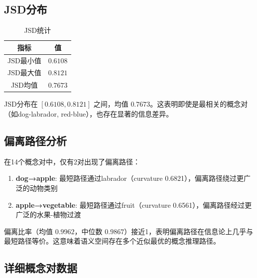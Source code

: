 \documentclass[
 UTF8,
 fontset=mac,
]{ctexart}
\begin{document}
\subsection{JSD分布}\label{jsd-results}

\begin{table}[htbp]
\centering
\caption{JSD统计}
\begin{tabular}{cc}
\toprule
指标 & 值 \\
\midrule
JSD最小值 & $0.6108$ \\
JSD最大值 & $0.8121$ \\
JSD均值 & $0.7673$ \\
\bottomrule
\end{tabular}
\end{table}

JSD分布在 $[0.6108, 0.8121]$ 之间，均值 $0.7673$。这表明即使是最相关的概念对（如dog-labrador, red-blue），也存在显著的信息差异。

\subsection{偏离路径分析}\label{detour-results}

在14个概念对中，仅有2对出现了偏离路径：
\begin{enumerate}
    \item \textbf{dog→apple}: 最短路径通过labrador（curvature 0.6821），偏离路径绕过更广泛的动物类别
    \item \textbf{apple→vegetable}: 最短路径通过fruit（curvature 0.6561），偏离路径经过更广泛的水果-植物过渡
\end{enumerate}

偏离比率（均值 $0.9962$，中位数 $0.9867$）接近1，表明偏离路径在信息论上几乎与最短路径等价。这意味着语义空间存在多个近似最优的概念推理路径。

\subsection{详细概念对数据}\label{pair-data}
\end{document}
